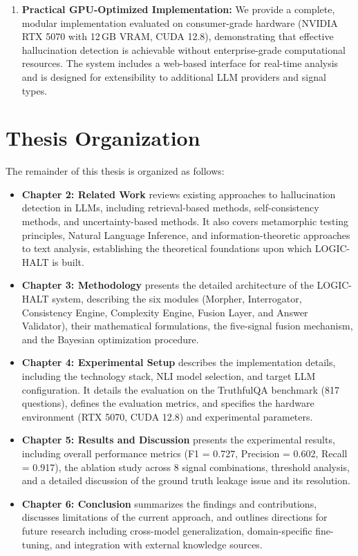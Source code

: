 \begin{enumerate}
    \item \textbf{Practical GPU-Optimized Implementation:} We provide a complete, modular implementation evaluated on consumer-grade hardware (NVIDIA RTX 5070 with 12\,GB VRAM, CUDA 12.8), demonstrating that effective hallucination detection is achievable without enterprise-grade computational resources. The system includes a web-based interface for real-time analysis and is designed for extensibility to additional LLM providers and signal types.
\end{enumerate}

\section{Thesis Organization}

The remainder of this thesis is organized as follows:

\begin{itemize}
    \item \textbf{Chapter 2: Related Work} reviews existing approaches to hallucination detection in LLMs, including retrieval-based methods, self-consistency methods, and uncertainty-based methods. It also covers metamorphic testing principles, Natural Language Inference, and information-theoretic approaches to text analysis, establishing the theoretical foundations upon which LOGIC-HALT is built.

    \item \textbf{Chapter 3: Methodology} presents the detailed architecture of the LOGIC-HALT system, describing the six modules (Morpher, Interrogator, Consistency Engine, Complexity Engine, Fusion Layer, and Answer Validator), their mathematical formulations, the five-signal fusion mechanism, and the Bayesian optimization procedure.

    \item \textbf{Chapter 4: Experimental Setup} describes the implementation details, including the technology stack, NLI model selection, and target LLM configuration. It details the evaluation on the TruthfulQA benchmark (817 questions), defines the evaluation metrics, and specifies the hardware environment (RTX 5070, CUDA 12.8) and experimental parameters.

    \item \textbf{Chapter 5: Results and Discussion} presents the experimental results, including overall performance metrics (F1 = 0.727, Precision = 0.602, Recall = 0.917), the ablation study across 8 signal combinations, threshold analysis, and a detailed discussion of the ground truth leakage issue and its resolution.

    \item \textbf{Chapter 6: Conclusion} summarizes the findings and contributions, discusses limitations of the current approach, and outlines directions for future research including cross-model generalization, domain-specific fine-tuning, and integration with external knowledge sources.
\end{itemize}
